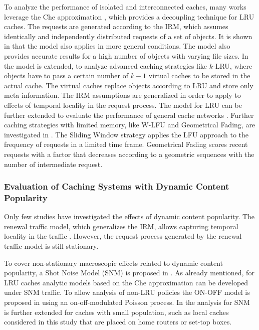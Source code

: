 To analyze the performance of isolated and interconnected caches, many works leverage the Che approximation \cite{che2002hierarchical}, which provides a decoupling technique for LRU caches.
The requests are generated according to the IRM, which assumes identically and independently distributed requests of a set of objects.
It is shown in \cite{fricker2012versatile, fricker2012impact} that the model also applies in more general conditions.
The model also provides accurate results for a high number of objects with varying file sizes.
In \cite{martina2014unified} the model is extended, to analyze advanced caching strategies like {$k$-LRU}, where objects have to pass a certain number of $k-1$ virtual caches to be stored in the actual cache.
The virtual caches replace objects according to LRU and store only meta information.
The IRM assumptions are generalized in order to apply to effects of temporal locality in the request process.
The model for LRU can be further extended to evaluate the performance of general cache networks \cite{rosensweig2010approximate, martina2014unified}.
Further caching strategies with limited memory, like W-LFU and Geometrical Fading, are investigated in \cite{hasslinger2014caching}.
The Sliding Window strategy applies the LFU approach to the frequency of requests in a limited time frame.
Geometrical Fading scores recent requests with a factor that decreases according to a geometric sequences with the number of intermediate request.

\subsubsection{Evaluation of Caching Systems with Dynamic Content Popularity}

Only few studies have investigated the effects of dynamic content popularity.
The renewal traffic model, which generalizes the IRM, allows capturing temporal locality in the traffic \cite{martina2014unified}.
However, the request process generated by the renewal traffic model is still stationary.

To cover non-stationary macroscopic effects related to dynamic content popularity, a Shot Noise Model (SNM) is proposed in \cite{traverso2013temporal}. As already mentioned, for LRU caches analytic models based on the Che approximation can be developed under SNM traffic.
To allow analysis of non-LRU policies the ON-OFF model is proposed in \cite{garetto2014dynamic} using an on-off-modulated Poisson process.
In \cite{leconte2016dynamic} the analysis for SNM is further extended for caches with small population, such as local caches considered in this study that are placed on home routers or set-top boxes.

